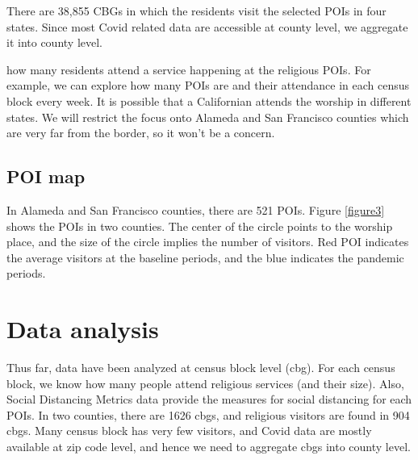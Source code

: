 \documentclass[12pt,english]{article}
\begin{document}
	There are 38,855 CBGs in which the residents visit the selected POIs in four states. Since most Covid related data are accessible at county level, we aggregate it into county level.  
	
	
	
	
	
	 how many residents attend a service happening at the religious POIs. For example, we can explore how many POIs are and their attendance in each census block every week. It is possible that a Californian attends the worship in different states. We will restrict the focus onto Alameda and San Francisco counties  which are very far from the border, so it won't be a concern. 
	
	
	
	
	
	
	\subsection{POI map}
	In Alameda and San Francisco counties, there are 521 POIs. Figure \ref{figure3} shows the POIs in two counties.  The center of the circle points to the worship place, and the size of the circle implies the number of visitors. Red POI indicates the average visitors at the baseline periods, and the blue indicates the pandemic periods. 
	
	
	\section{Data analysis}
	Thus far, data have been analyzed at census block level (cbg). For each census block, we know how many people attend religious services (and their size). Also, Social Distancing Metrics data provide the measures for social distancing for each POIs. In two counties, there are 1626 cbgs, and religious visitors are found in 904 cbgs. Many census block has very few visitors, and Covid data are mostly available at zip code level, and hence we need to aggregate cbgs into county level. 
	
	
\end{document}
